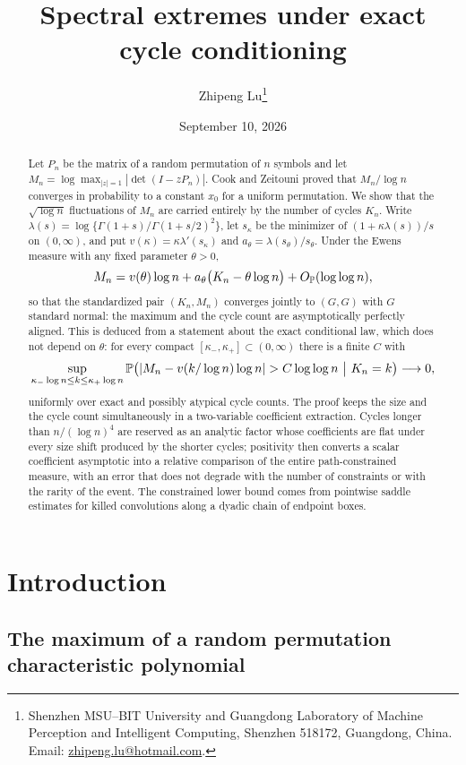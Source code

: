 \documentclass[11pt]{article}
\title{Spectral extremes under exact cycle conditioning}
\author{Zhipeng Lu\thanks{Shenzhen MSU--BIT University and Guangdong
Laboratory of Machine Perception and Intelligent Computing,
Shenzhen 518172, Guangdong, China.
Email: \href{mailto:zhipeng.lu@hotmail.com}{zhipeng.lu@hotmail.com}.}}
\date{September 10, 2026}
\theoremstyle{definition}\newtheorem{definition}[theorem]{Definition}
\theoremstyle{remark}\newtheorem{remark}[theorem]{Remark}
\newcommand{\Op}{O_{\Pp}}\newcommand{\eps}{\varepsilon}
\numberwithin{equation}{section}\allowdisplaybreaks
\begin{document}
\maketitle
\begin{abstract}
Let $P_n$ be the matrix of a random permutation of $n$ symbols and let
$M_n=\log\max_{|z|=1}|\det(I-zP_n)|$. Cook and Zeitouni proved that
$M_n/\log n$ converges in probability to a constant $x_0$ for a uniform
permutation. We show that the $\sqrt{\log n}$ fluctuations of $M_n$ are
carried entirely by the number of cycles $K_n$. Write
$\lambda(s)=\log\{\Gamma(1+s)/\Gamma(1+s/2)^2\}$, let $s_\kappa$ be the
minimizer of $(1+\kappa\lambda(s))/s$ on $(0,\infty)$, and put
$v(\kappa)=\kappa\lambda'(s_\kappa)$ and
$a_\theta=\lambda(s_\theta)/s_\theta$. Under the Ewens measure with any
fixed parameter $\theta>0$,
\[
 M_n=v(\theta)\log n+a_\theta\bigl(K_n-\theta\log n\bigr)
       +\Op(\log\log n),
\]
so that the standardized pair $(K_n,M_n)$ converges jointly to $(G,G)$
with $G$ standard normal: the maximum and the cycle count are
asymptotically perfectly aligned. This is deduced from a statement about
the exact conditional law, which does not depend on $\theta$: for every
compact $[\kappa_-,\kappa_+]\subset(0,\infty)$ there is a finite $C$ with
\[
 \sup_{\kappa_-\log n\le k\le\kappa_+\log n}
 \Pp\bigl(|M_n-v(k/\log n)\log n|>C\log\log n\ \big|\ K_n=k\bigr)
 \longrightarrow0,
\]
uniformly over exact and possibly atypical cycle counts. The proof keeps
the size and the cycle count simultaneously in a two-variable
coefficient extraction. Cycles longer than $n/(\log n)^4$ are reserved as
an analytic factor whose coefficients are flat under every size shift
produced by the shorter cycles; positivity then converts a scalar
coefficient asymptotic into a relative comparison of the entire
path-constrained measure, with an error that does not degrade with the
number of constraints or with the rarity of the event. The constrained
lower bound comes from pointwise saddle estimates for killed
convolutions along a dyadic chain of endpoint boxes.
\end{abstract}

\section{Introduction}\label{sec:intro}

\subsection{The maximum of a random permutation characteristic
polynomial}
\end{document}
